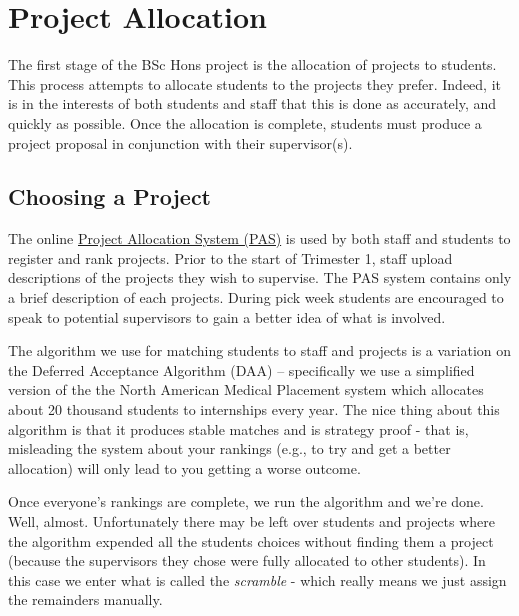 \chapter{Project Allocation}
The first stage of the BSc Hons project is the
allocation of projects to students.  This process attempts to allocate
students to the projects they prefer.  Indeed, it is in the interests
of both students and staff that this is done as accurately, and
quickly as possible.  Once the allocation is complete, students must
produce a project proposal in conjunction with their
supervisor(s).

\section{Choosing a Project}

The online \href{https://ecs.wgtn.ac.nz/apps/projectselection/}{Project Allocation System (PAS)} is used by both staff and
students to register and rank projects.  Prior to the start of
Trimester 1, staff upload descriptions of the projects
they wish to supervise. The PAS system contains only a brief description of
each projects. During pick week students are encouraged to speak to potential
supervisors to gain a better idea of what is involved.

The algorithm we use for matching students to staff and projects is a
variation on the Deferred Acceptance Algorithm (DAA) -- specifically
we use a simplified version of the the North American Medical
Placement system which allocates about 20 thousand students to
internships every year.  The nice thing about this algorithm is that
it produces stable matches and is strategy proof - that is,
misleading the system about your rankings (e.g., to try and get a better
allocation) will only lead to you getting a worse outcome.

Once everyone's rankings are complete, we run the algorithm and we're
done.  Well, almost.  Unfortunately there may be left over students and
projects where the algorithm expended all the students choices without
finding them a project (because the supervisors they chose were
fully allocated to other students).  In this case we enter what is
called the {\em scramble} - which really means we just assign the remainders manually.

